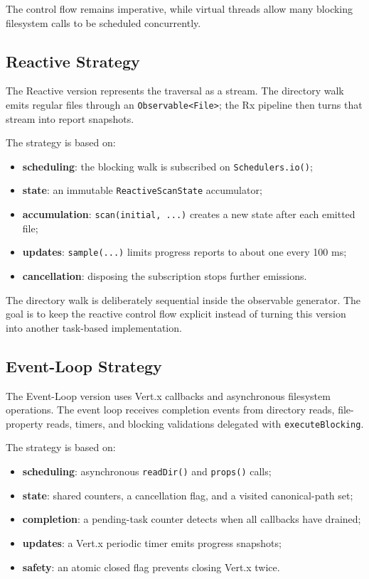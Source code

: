 The control flow remains imperative, while virtual threads allow many blocking filesystem calls to be scheduled concurrently.

\subsection{Reactive Strategy}

The Reactive version represents the traversal as a stream.
The directory walk emits regular files through an \texttt{Observable<File>}; the Rx pipeline then turns that stream into report snapshots.

The strategy is based on:

\begin{itemize}
  \item \textbf{scheduling}: the blocking walk is subscribed on \texttt{Schedulers.io()};
  \item \textbf{state}: an immutable \texttt{ReactiveScanState} accumulator;
  \item \textbf{accumulation}: \texttt{scan(initial, ...)} creates a new state after each emitted file;
  \item \textbf{updates}: \texttt{sample(...)} limits progress reports to about one every 100 ms;
  \item \textbf{cancellation}: disposing the subscription stops further emissions.
\end{itemize}

The directory walk is deliberately sequential inside the observable generator.
The goal is to keep the reactive control flow explicit instead of turning this version into another task-based implementation.

\subsection{Event-Loop Strategy}

The Event-Loop version uses Vert.x callbacks and asynchronous filesystem operations.
The event loop receives completion events from directory reads, file-property reads, timers, and blocking validations delegated with \texttt{executeBlocking}.

The strategy is based on:

\begin{itemize}
  \item \textbf{scheduling}: asynchronous \texttt{readDir()} and \texttt{props()} calls;
  \item \textbf{state}: shared counters, a cancellation flag, and a visited canonical-path set;
  \item \textbf{completion}: a pending-task counter detects when all callbacks have drained;
  \item \textbf{updates}: a Vert.x periodic timer emits progress snapshots;
  \item \textbf{safety}: an atomic closed flag prevents closing Vert.x twice.
\end{itemize}

